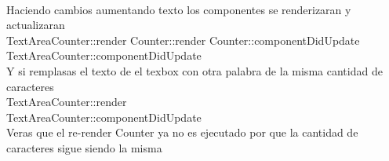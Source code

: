 \\
Haciendo cambios aumentando texto los componentes se renderizaran y actualizaran
\\TextAreaCounter::render
Counter::render
Counter::componentDidUpdate
TextAreaCounter::componentDidUpdate
\\
Y si remplasas el texto de el texbox con otra palabra de la misma cantidad de caracteres \\
TextAreaCounter::render\\
TextAreaCounter::componentDidUpdate\\
Veras que el re-render Counter ya no es ejecutado por que la cantidad de caracteres sigue siendo la misma

